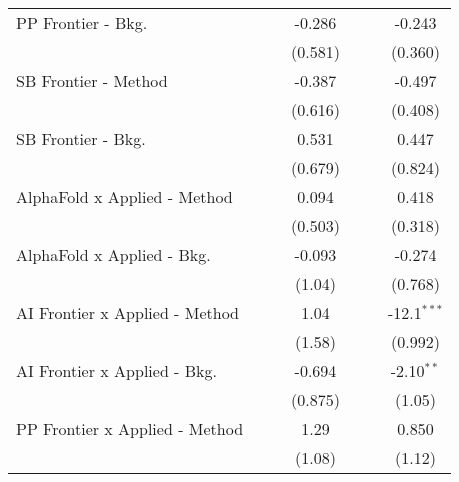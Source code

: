 \begin{tabular}{lcccccc}
   PP Frontier - Bkg.             &               &               & -0.286       &               &               & -0.243\\   
                                  &               &               & (0.581)      &               &               & (0.360)\\   
   SB Frontier - Method           &               &               & -0.387       &               &               & -0.497\\   
                                  &               &               & (0.616)      &               &               & (0.408)\\   
   SB Frontier - Bkg.             &               &               & 0.531        &               &               & 0.447\\   
                                  &               &               & (0.679)      &               &               & (0.824)\\   
   AlphaFold x Applied - Method   &               &               & 0.094        &               &               & 0.418\\   
                                  &               &               & (0.503)      &               &               & (0.318)\\   
   AlphaFold x Applied - Bkg.     &               &               & -0.093       &               &               & -0.274\\   
                                  &               &               & (1.04)       &               &               & (0.768)\\   
   AI Frontier x Applied - Method &               &               & 1.04         &               &               & -12.1$^{***}$\\   
                                  &               &               & (1.58)       &               &               & (0.992)\\   
   AI Frontier x Applied - Bkg.   &               &               & -0.694       &               &               & -2.10$^{**}$\\   
                                  &               &               & (0.875)      &               &               & (1.05)\\   
   PP Frontier x Applied - Method &               &               & 1.29         &               &               & 0.850\\   
                                  &               &               & (1.08)       &               &               & (1.12)\\   

\end{tabular}
